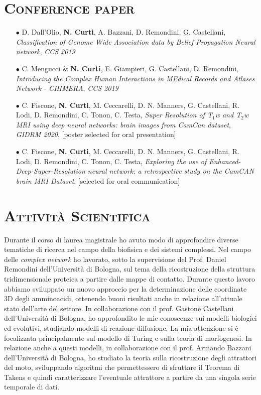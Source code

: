\documentclass[a4paper,11pt]{article}
\begin{document}
\section*{\scshape{Conference paper}}

\begin{itemize}

  \item[$\bullet$] D. Dall'Olio, \textbf{N. Curti}, A. Bazzani, D. Remondini, G. Castellani, \emph{Classification of Genome Wide Association data by Belief Propagation Neural network}, \emph{CCS 2019}

  \item[$\bullet$] C. Mengucci \& \textbf{N. Curti}, E. Giampieri, G. Castellani, D. Remondini, \emph{Introducing the Complex Human Interactions in MEdical Records and Atlases Network - CHIMERA}, \emph{CCS 2019}

  \item[$\bullet$] C. Fiscone, \textbf{N. Curti}, M. Ceccarelli, D. N. Manners, G. Castellani, R. Lodi, D. Remondini, C. Tonon, C. Testa, \emph{Super Resolution of T$_1$w and T$_2$w MRI using deep neural networks: brain images from CamCan dataset}, \emph{GIDRM 2020}, [poster selected for oral presentation]

  \item[$\bullet$] C. Fiscone, \textbf{N. Curti}, M. Ceccarelli, D. N. Manners, G. Castellani, R. Lodi, D. Remondini, C. Tonon, C. Testa, \emph{Exploring the use of Enhanced-Deep-Super-Resolution neural network: a retrospective study on the CamCAN brain MRI Dataset}, [selected for oral communication]

\end{itemize}




\vspace*{0.5cm}
\section*{\scshape{Attività Scientifica}}

Durante il corso di laurea magistrale ho avuto modo di approfondire diverse tematiche di ricerca nel campo della biofisica e dei sistemi complessi.
Nel campo delle \emph{complex network} ho lavorato, sotto la supervisione del Prof. Daniel Remondini dell'Università di Bologna, sul tema della ricostruzione della struttura tridimensionale proteica a partire dalle mappe di contatto.
Durante questo lavoro abbiamo sviluppato un nuovo approccio per la determinazione delle coordinate 3D degli amminoacidi, ottenendo buoni risultati anche in relazione all'attuale stato dell'arte del settore.
In collaborazione con il prof. Gastone Castellani dell'Università di Bologna, ho approfondito le mie conoscenze sui modelli biologici ed evolutivi, studiando modelli di reazione-diffusione.
La mia attenzione si è focalizzata principalmente sul modello di Turing e sulla teoria di morfogenesi.
In relazione anche a questi modelli, in collaborazione con il prof. Armando Bazzani dell'Università di Bologna, ho studiato la teoria sulla ricostruzione degli attrattori del moto, sviluppando algoritmi che permettessero di sfruttare il Teorema di Takens e quindi caratterizzare l'eventuale attrattore a partire da una singola serie temporale di dati.
\end{document}
